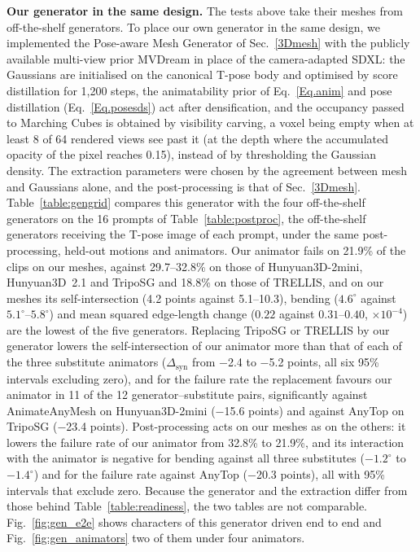 \documentclass[lettersize,journal]{IEEEtran}
\newenvironment{revblock}{\par\color{red}}{\par}
\begin{document}
\begin{revblock}
\textbf{Our generator in the same design.} The tests above take their meshes from off-the-shelf
generators. To place our own generator in the same design, we implemented the Pose-aware Mesh
Generator of Sec.~\ref{3Dmesh} with the publicly available multi-view prior MVDream
\cite{shi2024mvdream} in place of the camera-adapted SDXL: the Gaussians are initialised on the
canonical T-pose body and optimised by score distillation for 1,200 steps, the animatability prior of
Eq.~\ref{Eq.anim} and pose distillation (Eq.~\ref{Eq.posesds}) act after densification, and the
occupancy passed to Marching Cubes is obtained by visibility carving, a voxel being empty when at
least 8 of 64 rendered views see past it (at the depth where the accumulated opacity of the pixel
reaches 0.15), instead of by thresholding the Gaussian density. The extraction parameters were
chosen by the agreement between mesh and Gaussians alone, and the post-processing is that of
Sec.~\ref{3Dmesh}. Table~\ref{table:gengrid} compares this generator with the four off-the-shelf
generators on the 16 prompts of Table~\ref{table:postproc}, the off-the-shelf generators receiving
the T-pose image of each prompt, under the same post-processing, held-out motions and animators.
Our animator fails on 21.9\% of the clips on our meshes, against 29.7--32.8\% on those
of Hunyuan3D-2mini, Hunyuan3D~2.1 and TripoSG and 18.8\% on those of TRELLIS, and on our meshes
its self-intersection (4.2 points against 5.1--10.3), bending
($4.6^{\circ}$ against $5.1^{\circ}$--$5.8^{\circ}$) and mean squared edge-length change
($0.22$ against $0.31$--$0.40$, $\times10^{-4}$) are the lowest of the five
generators. Replacing TripoSG or TRELLIS by our generator lowers the self-intersection of our
animator more than that of each of the three substitute animators ($\Delta_{\text{syn}}$ from
$-$2.4 to $-$5.2 points, all six 95\% intervals excluding zero), and for the failure rate
the replacement favours our animator in 11 of the 12 generator--substitute pairs, significantly
against AnimateAnyMesh on Hunyuan3D-2mini ($-$15.6 points) and against AnyTop on
TripoSG ($-$23.4 points). Post-processing acts on our meshes as
on the others: it lowers the failure rate of our animator from 32.8\% to 21.9\%, and its
interaction with the animator is negative for bending against all three substitutes
($-1.2^{\circ}$ to $-1.4^{\circ}$) and for the failure rate against AnyTop
($-$20.3 points), all with 95\% intervals that exclude zero. Because the generator and
the extraction differ from those behind Table~\ref{table:readiness}, the two tables are not
comparable. Fig.~\ref{fig:gen_e2e} shows characters of this generator driven end to end and
Fig.~\ref{fig:gen_animators} two of them under four animators.
\end{revblock}
\end{document}
